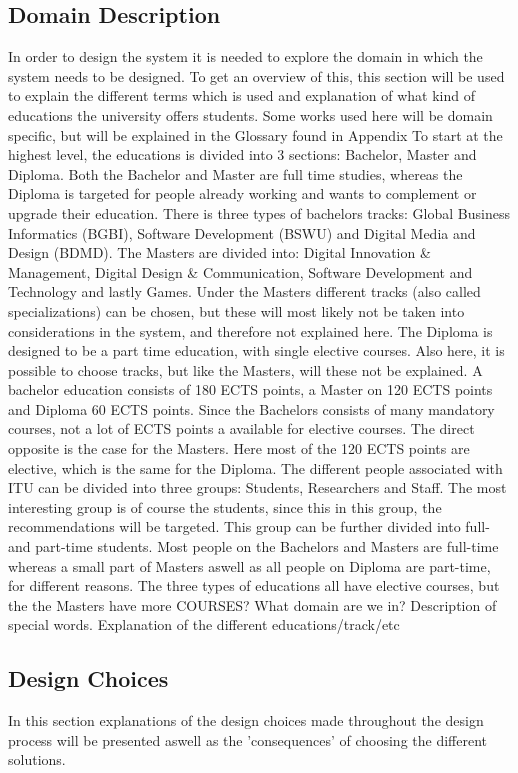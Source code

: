 \subsection{Domain Description}
In order to design the system it is needed to explore the domain in which the system needs to be designed. To get an overview of this, this section will be used to explain the different terms which is used and explanation of what kind of educations the university offers students. Some works used here will be domain specific, but will be explained in the Glossary found in Appendix 
To start at the highest level, the educations is divided into 3 sections: Bachelor, Master and Diploma. Both the Bachelor and Master are full time studies, whereas the Diploma is targeted for people already working and wants to complement or upgrade their education. There is three types of bachelors tracks: Global Business Informatics (BGBI), Software Development (BSWU) and Digital Media and Design (BDMD). The Masters are divided into: Digital Innovation \& Management, Digital Design \& Communication, Software Development and Technology and lastly Games. Under the Masters different tracks (also called specializations) can be chosen, but these will most likely not be taken into considerations in the system, and therefore not explained here. The Diploma is designed to be a part time education, with single elective courses. Also here, it is possible to choose tracks, but like the Masters, will these not be explained. 
A bachelor education consists of 180 ECTS points, a Master on 120 ECTS points and Diploma 60 ECTS points. Since the Bachelors consists of many mandatory courses, not a lot of ECTS points a available for elective courses. The direct opposite is the case for the Masters. Here most of the 120 ECTS points are elective, which is the same for the Diploma. 
The different people associated with ITU can be divided into three groups: Students, Researchers and Staff. The most interesting group is of course the students, since this in this group, the recommendations will be targeted. This group can be further divided into full- and part-time students. Most people on the Bachelors and Masters are full-time whereas a small part of Masters aswell as all people on Diploma are part-time, for different reasons. 
The three types of educations all have elective courses, but the the Masters have more 
COURSES?
What domain are we in? Description of special words. Explanation of the different educations/track/etc

\subsection{Design Choices}
In this section explanations of the design choices made throughout the design process will be presented aswell as the 'consequences' of choosing the different solutions. 
